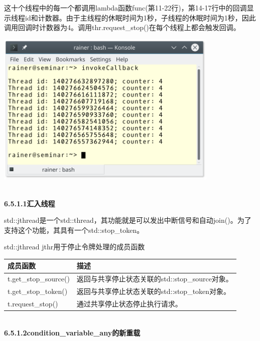 这十个线程中的每一个都调用lambda函数func(第11-22行)，第14-17行中的回调显示线程id和计数器。由于主线程的休眠时间为1秒，子线程的休眠时间为1秒，因此调用回调时计数器为4。调用thr.request\_stop()在每个线程上都会触发回调。

\begin{center}
\includegraphics[width=0.8\textwidth]{content/3/chapter6/images/23.png}\\
\end{center}


\hspace*{\fill} \\ %
\noindent
\textbf{6.5.1.1\hspace{0.2cm}汇入线程}

std::jthread是一个std::thread，其功能就是可以发出中断信号和自动join()。为了支持这个功能，其具有一个std::stop\_token。

\begin{center}
std::jthread jthr用于停止令牌处理的成员函数
\end{center}

\begin{table}[H]
\centering
\begin{tabular}{ll}
\textbf{成员函数}   & \textbf{描述}                                        \\ \hline
t.get\_stop\_source() & 返回与共享停止状态关联的std::stop\_source对象。 \\
t.get\_stop\_token()  & 返回与共享停止状态关联的std::stop\_token对象。  \\
t.request\_stop() & 通过共享停止状态停止执行请求。
\end{tabular}
\end{table}

\hspace*{\fill} \\ %
\noindent
\textbf{6.5.1.2\hspace{0.2cm}condition\_variable\_any的新重载}

